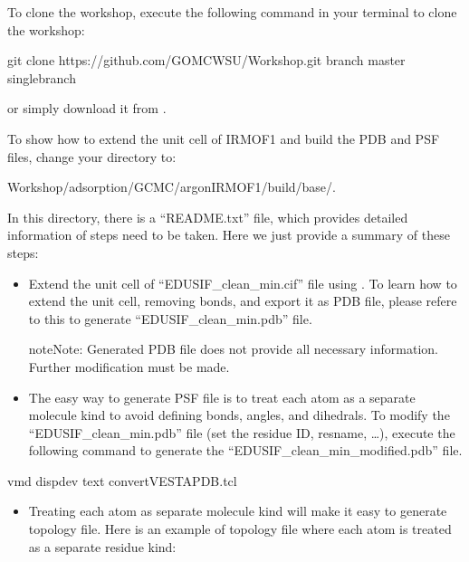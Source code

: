 \documentclass[letterpaper,10pt,english]{sphinxmanual}
\begin{document}
\begin{enumerate}
To clone the workshop, execute the following command in your terminal to clone the workshop:

\begin{sphinxVerbatim}[commandchars=\\\{\}]
\PYGZdl{} git  clone    https://github.com/GOMC\PYGZhy{}WSU/Workshop.git \PYGZhy{}\PYGZhy{}branch master \PYGZhy{}\PYGZhy{}single\PYGZhy{}branch
\end{sphinxVerbatim}

or simply download it from  .

To show how to extend the unit cell of IRMOF\sphinxhyphen{}1 and build the PDB and PSF files, change your directory to:

\begin{sphinxVerbatim}[commandchars=\\\{\}]
\PYGZdl{}    Workshop/adsorption/GCMC/argon\PYGZus{}IRMOF\PYGZus{}1/build/base/.
\end{sphinxVerbatim}

In this directory, there is a “README.txt” file, which provides detailed information of steps need to be taken. Here we just provide a summary of these steps:
\begin{itemize}
\item {} 
Extend the unit cell of “EDUSIF\_clean\_min.cif” file using . To learn how to extend the
unit cell, removing bonds, and export it as PDB file, please refere to this  to generate “EDUSIF\_clean\_min.pdb” file.

\begin{sphinxadmonition}{note}{Note:}
Generated PDB file does not provide all necessary information. Further modification must be made.
\end{sphinxadmonition}

\item {} 
The easy way to generate PSF file is to treat each atom as a separate molecule kind to avoid defining bonds, angles, and dihedrals. To modify the “EDUSIF\_clean\_min.pdb” file (set the residue ID, resname, …), execute the following command to generate the
“EDUSIF\_clean\_min\_modified.pdb” file.

\end{itemize}

\begin{sphinxVerbatim}[commandchars=\\\{\}]
vmd \PYGZhy{}dispdev text \PYGZlt{} convert\PYGZus{}VESTA\PYGZus{}PDB.tcl
\end{sphinxVerbatim}
\begin{itemize}
\item {} 
Treating each atom as separate molecule kind will make it easy to generate topology file. Here is an example of topology file where each atom is treated
as a separate residue kind:


\end{itemize}
\end{enumerate}
\end{document}
